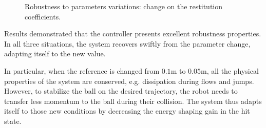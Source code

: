 \begin{figure}[!ht]
	\centering
	\caption[Robustness to parameters variations: restitution coefficients]{Robustness to parameters variations: change on the  restitution coefficients.}
	\label{fig:robc}
\end{figure}
%

Results demonstrated that the controller presents excellent robustness properties. In all three situations, the system recovers swiftly from the parameter change, adapting itself to the new value. 

In particular, when the reference is changed from $0.1$m to $0.05$m, all the physical properties of the system are conserved, e.g. dissipation during flows and jumps. However, to stabilize the ball on the desired trajectory, the robot needs to transfer less momentum to the ball during their collision. The system thus adapts itself to those new conditions by decreasing the energy shaping gain in the hit state. 

